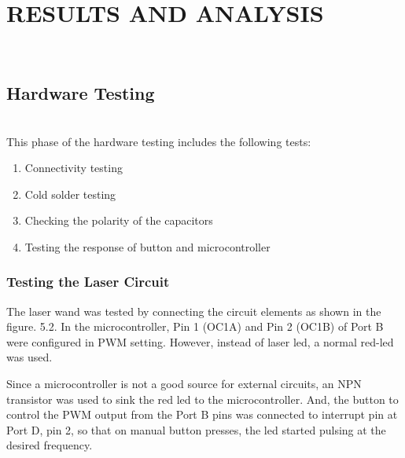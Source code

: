 \documentclass[12pt, a4paper]{article}
\begin{document}
{\section{RESULTS AND ANALYSIS}
~\\
\subsection{Hardware Testing}
~\\
This phase of the hardware testing includes the following tests:
\begin{enumerate}
\item Connectivity testing
\item Cold solder testing
\item Checking the polarity of the capacitors
\item Testing the response of button and microcontroller
\end{enumerate}

\subsubsection{Testing the Laser Circuit}

The laser wand was tested by connecting the circuit elements as shown in the figure. 5.2. In the microcontroller, Pin 1 (OC1A) and Pin 2 (OC1B) of Port B were configured in PWM setting. However, instead of laser led, a normal red-led was used. 

Since a microcontroller is not a good source for external circuits, an NPN transistor was used to sink the red led to the microcontroller. And, the button to control the PWM output from the Port B pins was connected to interrupt pin at Port D, pin 2, so that on manual button presses, the led started pulsing at the desired frequency.

}
\end{document}
